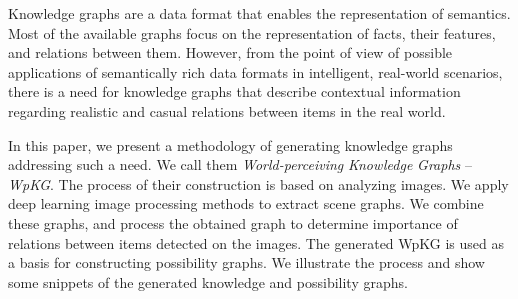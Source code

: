 

Knowledge graphs are a data format that enables the representation of semantics. Most of the available graphs focus on the representation of facts, their features, and relations between them. However, from the point of view of possible applications of semantically rich data formats in intelligent, real-world scenarios, there is a need for knowledge graphs that describe contextual information regarding realistic and casual relations between items in the real world.

In this paper, we present a methodology of generating knowledge graphs addressing such a need. We call them {\em World-perceiving} {\em Knowledge} {\em Gra\-phs} -- {\em WpKG}. The process of their construction is based on analyzing images. We apply deep learning image processing methods to extract scene graphs. We  combine these graphs, and process the obtained graph to determine  importance of relations between items detected on the images. The generated WpKG is used as a basis for constructing possibility graphs. We illustrate the process and show some snippets of the generated knowledge and possibility graphs.



